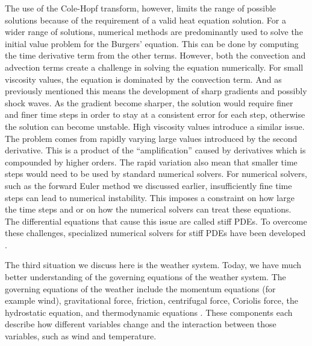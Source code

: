 The use of the Cole-Hopf transform, however, limits the range of possible solutions because of the requirement of a valid heat equation solution. For a wider range of solutions, numerical methods are predominantly used to solve the initial value problem for the Burgers' equation. This can be done by computing the time derivative term from the other terms. However, both the convection and advection terms create a challenge in solving the equation numerically. For small viscosity values, the equation is dominated by the convection term. And as previously mentioned this means the development of sharp gradients and possibly shock waves. As the gradient become sharper, the solution would require finer and finer time steps in order to stay at a consistent error for each step, otherwise the solution can become unstable.
High viscosity values introduce a similar issue. The problem comes from rapidly varying large values introduced by the second derivative. This is a product of the \enquote{amplification} caused by derivatives which is compounded by higher orders. The rapid variation also mean that smaller time steps would need to be used by standard numerical solvers. For numerical solvers, such as the forward Euler method we discussed earlier, insufficiently fine time steps can lead to numerical instability. This imposes a constraint on how large the time steps and or on how the numerical solvers can treat these equations. The differential equations that cause this issue are called stiff PDEs. To overcome these challenges, specialized numerical solvers for stiff PDEs have been developed \autocite{kassamFourthOrderTimeSteppingStiff2005}.

The third situation we discuss here is the weather system. Today, we have much better understanding of the governing equations of the weather system. The governing equations of the weather include the momentum equations (for example wind), gravitational force, friction, centrifugal force, Coriolis force, the hydrostatic equation, and thermodynamic equations \autocite{martinIntroductionWeatherClimate2014}. These components each describe how different variables change and the interaction between those variables, such as wind and temperature.

